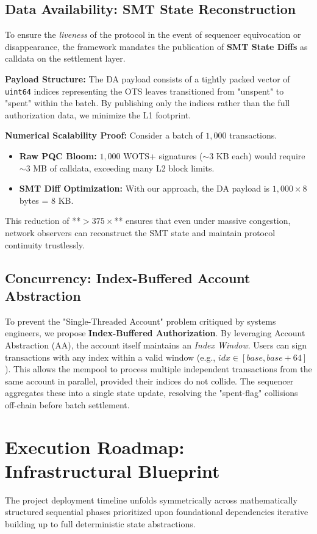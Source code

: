 \documentclass[conference]{IEEEtran}
\theoremstyle{definition}
\theoremstyle{plain}
\theoremstyle{remark}
\begin{document}
\subsection{Data Availability: SMT State Reconstruction}
To ensure the \textit{liveness} of the protocol in the event of sequencer equivocation or disappearance, the framework mandates the publication of \textbf{SMT State Diffs} as calldata on the settlement layer. 

\textbf{Payload Structure:} The DA payload consists of a tightly packed vector of \texttt{uint64} indices representing the OTS leaves transitioned from "unspent" to "spent" within the batch. By publishing only the indices rather than the full authorization data, we minimize the L1 footprint.

\textbf{Numerical Scalability Proof:}
Consider a batch of $1,000$ transactions. 
\begin{itemize}
    \item \textbf{Raw PQC Bloom:} $1,000$ WOTS+ signatures ($\sim 3$ KB each) would require $\sim 3$ MB of calldata, exceeding many L2 block limits.
    \item \textbf{SMT Diff Optimization:} With our approach, the DA payload is $1,000 \times 8$ bytes = $8$ KB. 
\end{itemize}
This reduction of **$>375\times$** ensures that even under massive congestion, network observers can reconstruct the SMT state and maintain protocol continuity trustlessly.

\subsection{Concurrency: Index-Buffered Account Abstraction}
To prevent the "Single-Threaded Account" problem critiqued by systems engineers, we propose \textbf{Index-Buffered Authorization}. By leveraging Account Abstraction (AA), the account itself maintains an \emph{Index Window}. Users can sign transactions with any index within a valid window (e.g., $idx \in [base, base + 64]$). This allows the mempool to process multiple independent transactions from the same account in parallel, provided their indices do not collide. The sequencer aggregates these into a single state update, resolving the "spent-flag" collisions off-chain before batch settlement.
\section{Execution Roadmap: Infrastructural Blueprint}
The project deployment timeline unfolds symmetrically across mathematically structured sequential phases prioritized upon foundational dependencies iterative building up to full deterministic state abstractions.
\end{document}
